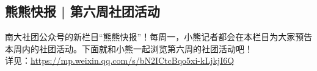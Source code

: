 \documentclass[letterpaper, 12pt]{article}
\begin{document}
\begin{multicols}{2}
\subsection{熊熊快报 | 第六周社团活动}
南大社团公众号的新栏目“熊熊快报”！每周一，小熊记者都会在本栏目为大家预告本周内的社团活动。下面就和小熊一起浏览第六周的社团活动吧！
\\详见：\url{https://mp.weixin.qq.com/s/bN2ICtcBqo5xi-kLjkjI6Q}
\end{multicols}
\end{document}

